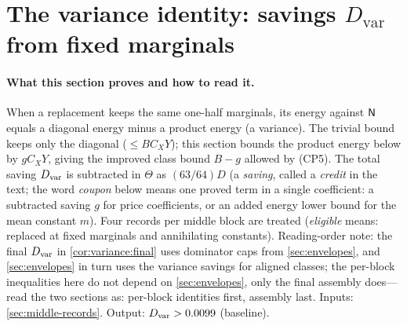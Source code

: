 \section{The variance identity: savings \texorpdfstring{$D_{\mathrm{var}}$}{D\_var} from fixed marginals}\label{sec:variance}

\paragraph{What this section proves and how to read it.}
When a replacement keeps the same one-half marginals, its energy
against $\mathsf N$ equals a diagonal energy minus a product energy (a
variance). The trivial bound keeps only the diagonal ($\le BC_XY$);
this section bounds the product energy below by $gC_XY$, giving the
improved class bound $B-g$ allowed by (CP5). The total saving
$D_{\rm var}$ is subtracted in $\Theta$ as $(63/64)D$ (a
\emph{saving}, called a \emph{credit} in the text; the word
\emph{coupon} below means one proved term in a single coefficient: a subtracted
saving $g$ for price coefficients, or an added energy lower bound
for the mean constant $m$). Four records per
middle block are treated (\emph{eligible} means: replaced at fixed
marginals and annihilating constants). Reading-order note: the
final $D_{\rm var}$ in \cref{cor:variance:final} uses dominator
caps from \cref{sec:envelopes}, and \cref{sec:envelopes} in turn
uses the variance savings for aligned classes; the per-block
inequalities here do not depend on \cref{sec:envelopes}, only the
final assembly does---read the two sections as: per-block
identities first, assembly last. Inputs:
\cref{sec:middle-records}. Output: $D_{\rm var}>0.0099$ (baseline).

